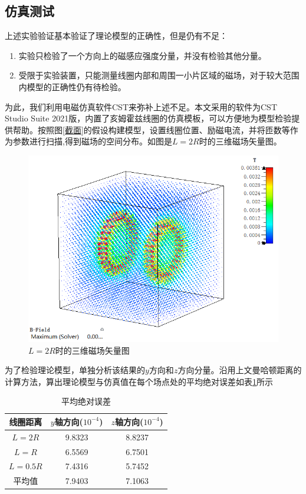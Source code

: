 \documentclass{ctexart}
\begin{document}
\begin{multicols}{2}
\section{仿真测试}
上述实验验证基本验证了理论模型的正确性，但是仍有不足：
\begin{enumerate}
    \item 实验只检验了一个方向上的磁感应强度分量，并没有检验其他分量。
    \item 受限于实验装置，只能测量线圈内部和周围一小片区域的磁场，对于较大范围内模型的正确性仍有待检验。
\end{enumerate}
为此，我们利用电磁仿真软件CST来弥补上述不足。本文采用的软件为CST Studio Suite 2021版，内置了亥姆霍兹线圈的仿真模板，可以方便地为模型检验提供帮助。按照图\ref{截面}的假设构建模型，设置线圈位置、励磁电流，并将匝数等作为参数进行扫描,得到磁场的空间分布。如图是$L=2R$时的三维磁场矢量图。
\begin{figure}[H]
    \centering
    \includegraphics[scale=0.5]{./pic/vector.bmp}
    \caption{$L=2R$时的三维磁场矢量图}
    \label{三维磁场矢量图}
\end{figure}
为了检验理论模型，单独分析该结果的$y$方向和$z$方向分量。沿用上文曼哈顿距离的计算方法，算出理论模型与仿真值在每个场点处的平均绝对误差如表\ref{每个场点处的平均百分误差}所示
\begin{table}[H]
    \centering
    \caption{平均绝对误差}
    \begin{tabular}{ccc}
        \hline
        线圈距离 & $y$轴方向($10^{-4}$) & $z$轴方向($10^{-4}$) \\ \hline
        $L=2R$ & 9.8323 & 8.8237 \\
        $L=R$ & 6.5569  & 6.7501  \\
        $L=0.5R$ & 7.4316 &5.7452 \\
        平均值 & 7.9403& 7.1063 \\ \hline
    \end{tabular}
    \label{每个场点处的平均百分误差}   
\end{table}


\end{multicols}
\end{document}
